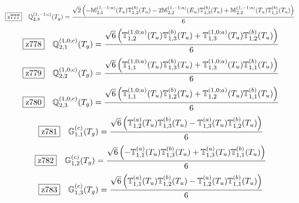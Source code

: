 \documentclass[fleqn,10pt,landscape]{jsarticle}
\begin{document}
\begin{dmath*}
\hspace*{3mm}\fbox{z777}\quad \mathbb{Q}_{2,3}^{(1,-1;c)}(T_{g})=\frac{\sqrt{2} \left(- \mathbb{M}_{2,1}^{(1,-1;a)}(T_{u}) \mathbb{T}_{1,2}^{(b)}(T_{u}) - 2 \mathbb{M}_{2,2}^{(1,-1;a)}(E_{u}) \mathbb{T}_{1,3}^{(b)}(T_{u}) + \mathbb{M}_{2,2}^{(1,-1;a)}(T_{u}) \mathbb{T}_{1,1}^{(b)}(T_{u})\right)}{6}
\end{dmath*}
\begin{dmath*}
\hspace*{3mm}\fbox{z778}\quad \mathbb{Q}_{2,1}^{(1,0;c)}(T_{g})=\frac{\sqrt{6} \left(\mathbb{T}_{1,2}^{(1,0;a)}(T_{u}) \mathbb{T}_{1,3}^{(b)}(T_{u}) + \mathbb{T}_{1,3}^{(1,0;a)}(T_{u}) \mathbb{T}_{1,2}^{(b)}(T_{u})\right)}{6}
\end{dmath*}
\begin{dmath*}
\hspace*{3mm}\fbox{z779}\quad \mathbb{Q}_{2,2}^{(1,0;c)}(T_{g})=\frac{\sqrt{6} \left(\mathbb{T}_{1,1}^{(1,0;a)}(T_{u}) \mathbb{T}_{1,3}^{(b)}(T_{u}) + \mathbb{T}_{1,3}^{(1,0;a)}(T_{u}) \mathbb{T}_{1,1}^{(b)}(T_{u})\right)}{6}
\end{dmath*}
\begin{dmath*}
\hspace*{3mm}\fbox{z780}\quad \mathbb{Q}_{2,3}^{(1,0;c)}(T_{g})=\frac{\sqrt{6} \left(\mathbb{T}_{1,1}^{(1,0;a)}(T_{u}) \mathbb{T}_{1,2}^{(b)}(T_{u}) + \mathbb{T}_{1,2}^{(1,0;a)}(T_{u}) \mathbb{T}_{1,1}^{(b)}(T_{u})\right)}{6}
\end{dmath*}
\begin{dmath*}
\hspace*{3mm}\fbox{z781}\quad \mathbb{G}_{1,1}^{(c)}(T_{g})=\frac{\sqrt{6} \left(\mathbb{T}_{1,2}^{(a)}(T_{u}) \mathbb{T}_{1,3}^{(b)}(T_{u}) - \mathbb{T}_{1,3}^{(a)}(T_{u}) \mathbb{T}_{1,2}^{(b)}(T_{u})\right)}{6}
\end{dmath*}
\begin{dmath*}
\hspace*{3mm}\fbox{z782}\quad \mathbb{G}_{1,2}^{(c)}(T_{g})=\frac{\sqrt{6} \left(- \mathbb{T}_{1,1}^{(a)}(T_{u}) \mathbb{T}_{1,3}^{(b)}(T_{u}) + \mathbb{T}_{1,3}^{(a)}(T_{u}) \mathbb{T}_{1,1}^{(b)}(T_{u})\right)}{6}
\end{dmath*}
\begin{dmath*}
\hspace*{3mm}\fbox{z783}\quad \mathbb{G}_{1,3}^{(c)}(T_{g})=\frac{\sqrt{6} \left(\mathbb{T}_{1,1}^{(a)}(T_{u}) \mathbb{T}_{1,2}^{(b)}(T_{u}) - \mathbb{T}_{1,2}^{(a)}(T_{u}) \mathbb{T}_{1,1}^{(b)}(T_{u})\right)}{6}
\end{dmath*}
\end{document}
